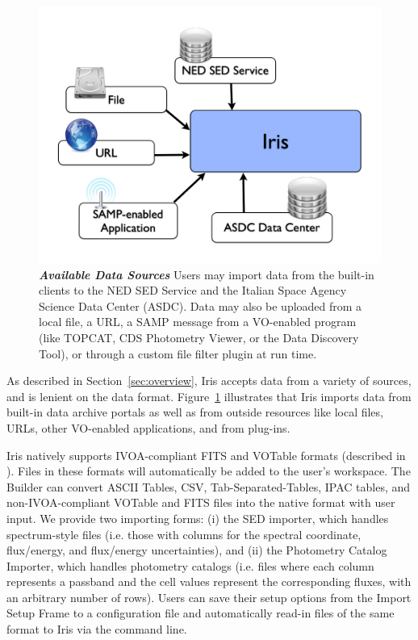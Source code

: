 \documentclass[final,5p,authoryear]{elsarticle}
\begin{document}
\begin{figure} \begin{center}
\includegraphics[width=\columnwidth]{figures/IrisDiagrams.002.png}
\caption{\textit{\textbf{\label{fig:data_sources} Available Data
Sources}}\textit{}\textbf{}\textit{} Users may import data from the built-in
clients to the NED SED Service and the Italian Space Agency Science Data Center
(ASDC). Data may also be uploaded from a local file, a URL, a SAMP message from
a VO-enabled program (like TOPCAT, CDS Photometry Viewer, or the Data Discovery
Tool), or through a custom file filter plugin at run time.} \end{center}
\end{figure}

As described in Section~\ref{sec:overview}, Iris accepts data from a variety of
sources, and is lenient on the data format. Figure~\ref{fig:data_sources}
illustrates that Iris imports data from built-in data archive portals as well as
from outside resources like local files, URLs, other VO-enabled applications,
and from plug-ins.

Iris natively supports IVOA-compliant FITS and VOTable formats (described in
\citet{2012arXiv1204.3055M}). Files in these formats will automatically be added
to the user's workspace. The Builder can convert ASCII Tables, CSV,
Tab-Separated-Tables, IPAC tables, and non-IVOA-compliant VOTable and FITS files
into the native format with user input. We provide two importing forms: (i) the
SED importer, which handles spectrum-style files (i.e. those with columns for
the spectral coordinate, flux/energy, and flux/energy uncertainties), and (ii)
the Photometry Catalog Importer, which handles photometry catalogs (i.e. files
where each column represents a passband and the cell values represent the
corresponding fluxes, with an arbitrary number of rows). Users can save their
setup options from the Import Setup Frame to a configuration file and
automatically read-in files of the same format to Iris via the command line.
\end{document}
